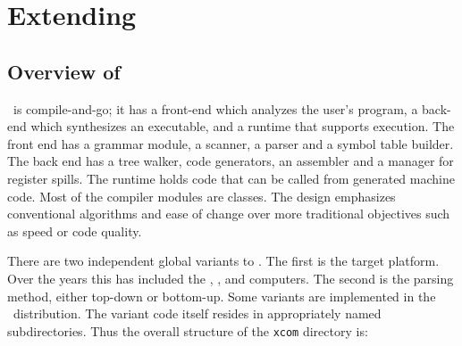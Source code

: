 




\setcounter{chapter}{\value{ExtensionChapter}}
\addtocounter{chapter}{-1}
\setcounter{page}{\value{ExtensionPage}}

\chapter{Extending \xcom} %
\section{Overview of \xcom}

\xcom\ is compile-and-go; it has a front-end which analyzes the user's program, a back-end which synthesizes an executable, and a runtime that supports execution.  The front end has a grammar module, a scanner, a parser and a symbol table builder.  The back end has a tree walker, code generators, an assembler and a manager for register spills.  The runtime holds  code that can be called from generated machine code.  Most of the compiler modules are  classes.  The design emphasizes conventional algorithms and ease of change over more traditional objectives such as speed or code quality.

There are two independent global variants to \xcom.  The first is the target platform.  Over the years this has included the , ,  and  computers.  The second is the parsing method, either top-down or bottom-up.  Some variants are implemented in the \xcom\ distribution.  The variant code itself resides in appropriately named subdirectories.  Thus the overall structure of the {\tt xcom} directory is:

